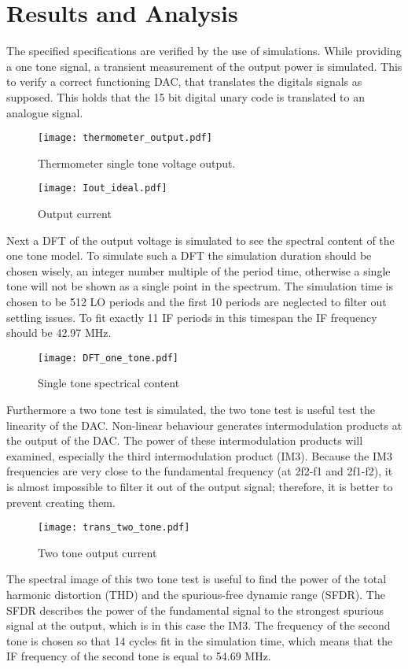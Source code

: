\section{Results and Analysis}\label{sec:simulations}
The specified specifications are verified by the use of simulations. While providing a one tone signal, a transient measurement of the output power is simulated. This to verify a correct functioning DAC, that translates the digitals signals as supposed. This holds that the 15 bit digital unary code is translated to an analogue signal.
\begin{figure}[htp] 
\texttt{[image: thermometer\_output.pdf]}
\caption{Thermometer single tone voltage output.}
\label{fig:Thermometer}
\end{figure}
\begin{figure}[htp] 
\texttt{[image: Iout\_ideal.pdf]}
\caption{Output current}
\label{fig:Output current}
\end{figure}
Next a DFT of the output voltage is simulated to see the spectral content of the one tone model. To simulate such a DFT the simulation duration should be chosen wisely, an integer number multiple of the period time, otherwise a single tone will not be shown as a single point in the spectrum. The simulation time is chosen to be 512 LO periods and the first 10 periods are neglected to filter out settling issues. To fit exactly 11 IF periods in this timespan the IF frequency should be 42.97 MHz.
\begin{figure}[htp] 
\texttt{[image: DFT\_one\_tone.pdf]}
\caption{Single tone spectrical content}
\label{fig:Single tone spectrical content}
\end{figure}
Furthermore a two tone test is simulated, the two tone test is useful test the linearity of the DAC. Non-linear behaviour generates intermodulation products at the output of the DAC. The power of these intermodulation products will examined, especially the third intermodulation product (IM3). Because the IM3 frequencies are very close to the fundamental frequency (at 2f2-f1 and 2f1-f2), it is almost impossible to filter it out of the output signal; therefore, it is better to prevent creating them.
\begin{figure}[htp] 
\texttt{[image: trans\_two\_tone.pdf]}
\caption{Two tone output current}
\label{Two tone output current}
\end{figure}
The spectral image of this two tone test is useful to find the power of the total harmonic distortion (THD) and the spurious-free dynamic range (SFDR).  The SFDR describes the power of the fundamental signal to the strongest spurious signal at the output, which is in this case the IM3. The frequency of the second tone is chosen so that 14 cycles fit in the simulation time, which means that the IF frequency of the second tone is equal to 54.69 MHz.
